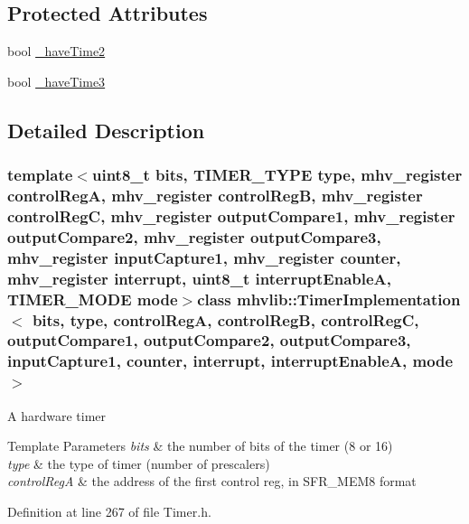 \subsection*{Protected Attributes}
\begin{DoxyCompactItemize}
\item 
bool \hyperlink{classmhvlib_1_1_timer_implementation_a47a4861cf076333bcf6c320c993bec90}{\-\_\-have\-Time2}
\item 
bool \hyperlink{classmhvlib_1_1_timer_implementation_a35ab0a13feb6011e01f5d9b850ef15e4}{\-\_\-have\-Time3}
\end{DoxyCompactItemize}


\subsection{Detailed Description}
\subsubsection*{template$<$uint8\-\_\-t bits, T\-I\-M\-E\-R\-\_\-\-T\-Y\-P\-E type, mhv\-\_\-register control\-Reg\-A, mhv\-\_\-register control\-Reg\-B, mhv\-\_\-register control\-Reg\-C, mhv\-\_\-register output\-Compare1, mhv\-\_\-register output\-Compare2, mhv\-\_\-register output\-Compare3, mhv\-\_\-register input\-Capture1, mhv\-\_\-register counter, mhv\-\_\-register interrupt, uint8\-\_\-t interrupt\-Enable\-A, T\-I\-M\-E\-R\-\_\-\-M\-O\-D\-E mode$>$class mhvlib\-::\-Timer\-Implementation$<$ bits, type, control\-Reg\-A, control\-Reg\-B, control\-Reg\-C, output\-Compare1, output\-Compare2, output\-Compare3, input\-Capture1, counter, interrupt, interrupt\-Enable\-A, mode $>$}

A hardware timer 
\begin{DoxyTemplParams}{Template Parameters}
{\em bits} & the number of bits of the timer (8 or 16) \\
\hline
{\em type} & the type of timer (number of prescalers) \\
\hline
{\em control\-Reg\-A} & the address of the first control reg, in S\-F\-R\-\_\-\-M\-E\-M8 format \\
\hline
\end{DoxyTemplParams}


Definition at line 267 of file Timer.\-h.



